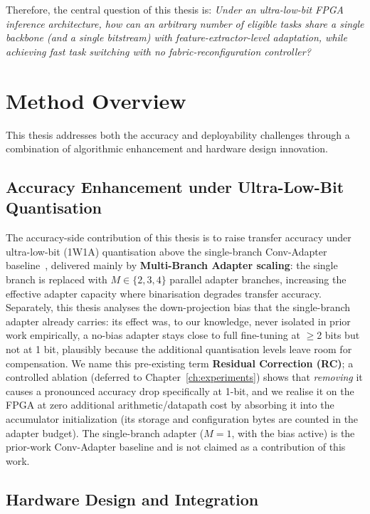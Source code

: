 \documentclass[12pt, a4paper]{report}
\numberwithin{equation}{chapter}
\numberwithin{figure}{chapter}
\numberwithin{table}{chapter}
\numberwithin{algorithm}{chapter}
\begin{document}
Therefore, the central question of this thesis is: \emph{Under an ultra-low-bit FPGA inference architecture, how can an arbitrary number of eligible tasks share a single backbone (and a single bitstream) with feature-extractor-level adaptation, while achieving fast task switching with no fabric-reconfiguration controller?}

\section{Method Overview}

This thesis addresses both the accuracy and deployability challenges through a combination of algorithmic enhancement and hardware design innovation.

\subsection{Accuracy Enhancement under Ultra-Low-Bit Quantisation}

The accuracy-side contribution of this thesis is to raise transfer accuracy under ultra-low-bit (1W1A) quantisation above the single-branch Conv-Adapter baseline~\cite{Chen2024ConvAdapter}, delivered mainly by \textbf{Multi-Branch Adapter scaling}: the single branch is replaced with $M \in \{2, 3, 4\}$ parallel adapter branches, increasing the effective adapter capacity where binarisation degrades transfer accuracy. Separately, this thesis analyses the down-projection bias that the single-branch adapter already carries: its effect was, to our knowledge, never isolated in prior work empirically, a no-bias adapter stays close to full fine-tuning at $\geq$2 bits but not at 1 bit, plausibly because the additional quantisation levels leave room for compensation. We name this pre-existing term \textbf{Residual Correction (RC)}; a controlled ablation (deferred to Chapter~\ref{ch:experiments}) shows that \emph{removing} it causes a pronounced accuracy drop specifically at 1-bit, and we realise it on the FPGA at zero additional arithmetic/datapath cost by absorbing it into the accumulator initialization (its storage and configuration bytes are counted in the adapter budget). The single-branch adapter ($M{=}1$, with the bias active) is the prior-work Conv-Adapter baseline and is not claimed as a contribution of this work.

\subsection{Hardware Design and Integration}
\end{document}
